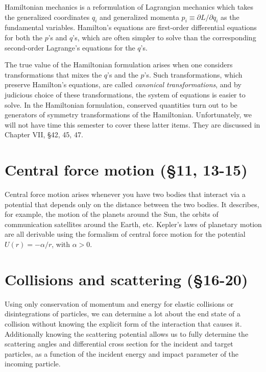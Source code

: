 \documentclass[10pt]{article}
\numberwithin{equation}{section}
\begin{document}
Hamiltonian mechanics is a reformulation of 
Lagrangian mechanics which takes the generalized
coordinates $q_i$ and generalized momenta 
$p_i\equiv \partial L/\partial q_i$
as the fundamental variables.
Hamilton's equations are first-order differential
equations for both the $p$'s and $q$'s, which are 
often simpler to solve than the corresponding 
second-order Lagrange's equations for the $q$'s.

The true value of the Hamiltonian formulation arises 
when one considers transformations that mixes the 
$q$'s and the $p$'s.  
Such transformations, which preserve Hamilton's equations,
are called {\em canonical transformations},
and by judicious choice of these transformations, the 
system of equations is easier to solve.
In the Hamiltonian formulation, conserved quantities
turn out to be generators of symmetry transformations of
the Hamiltonian.
Unfortunately, we will not have time this semester to 
cover these latter items.
They are discussed in Chapter VII, \S 42, 45, 47.

\section{Central force motion (\S11, 13-15)}

Central force motion arises whenever you have 
two bodies that interact via a potential that depends
only on the distance between the two bodies.
It describes, for example, the motion of the planets 
around the Sun, the orbits of communication satellites 
around the Earth, etc.
Kepler's laws of planetary motion are all derivable
using the formalism of central force motion for the 
potential $U(r)= -\alpha/r$, with $\alpha>0$.

\section{Collisions and scattering (\S16-20)}

Using only conservation of momentum and energy 
for elastic collisions or disintegrations of 
particles, we can determine a lot about the 
end state of a collision without knowing the 
explicit form of the interaction that causes it.
Additionally knowing the scattering potential 
allows us to fully determine the 
scattering angles and differential cross section 
for the incident and target particles, as a function 
of the incident energy and impact parameter of 
the incoming particle.
\end{document}
